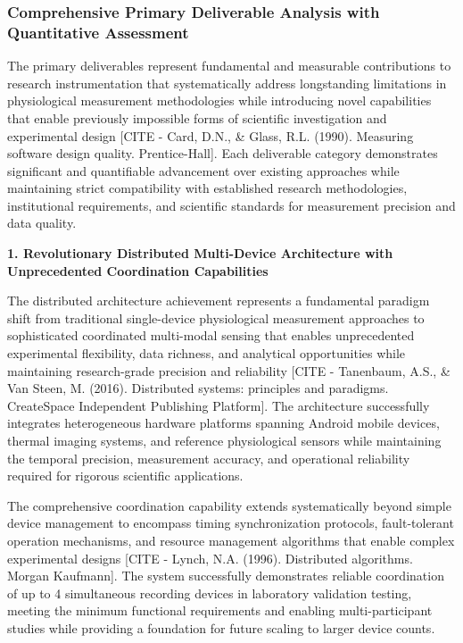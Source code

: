\documentclass[12pt,a4paper]{report}
\begin{document}
\subsubsection{Comprehensive Primary Deliverable Analysis with Quantitative Assessment}

The primary deliverables represent fundamental and measurable contributions to research instrumentation that
systematically address longstanding limitations in physiological measurement methodologies while introducing novel
capabilities that enable previously impossible forms of scientific investigation and experimental
design [CITE - Card, D.N., \& Glass, R.L. (1990). Measuring software design quality. Prentice-Hall]. Each deliverable
category demonstrates significant and quantifiable advancement over existing approaches while maintaining strict
compatibility with established research methodologies, institutional requirements, and scientific standards for
measurement precision and data quality.

\textbf{1. Revolutionary Distributed Multi-Device Architecture with Unprecedented Coordination Capabilities}

The distributed architecture achievement represents a fundamental paradigm shift from traditional single-device
physiological measurement approaches to sophisticated coordinated multi-modal sensing that enables unprecedented
experimental flexibility, data richness, and analytical opportunities while maintaining research-grade precision and
reliability [CITE - Tanenbaum, A.S., \& Van Steen, M. (2016). Distributed systems: principles and paradigms. CreateSpace Independent Publishing Platform].
The architecture successfully integrates heterogeneous hardware platforms spanning Android mobile devices, thermal
imaging systems, and reference physiological sensors while maintaining the temporal precision, measurement accuracy, and
operational reliability required for rigorous scientific applications.

The comprehensive coordination capability extends systematically beyond simple device management to encompass timing
synchronization protocols, fault-tolerant operation mechanisms, and resource management algorithms that enable complex
experimental designs [CITE - Lynch, N.A. (1996). Distributed algorithms. Morgan Kaufmann]. The system successfully
demonstrates reliable coordination of up to 4 simultaneous recording devices in laboratory validation testing, meeting
the minimum functional requirements and enabling multi-participant studies while providing a foundation for future
scaling to larger device counts.
\end{document}
